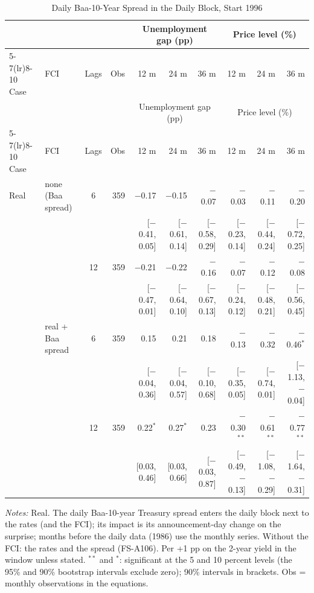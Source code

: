 \begingroup\scriptsize\setlength{\tabcolsep}{0.9pt}
\begin{longtable}{llcrrrrrrr}
\caption{Daily Baa-10-Year Spread in the Daily Block, Start 1996}\label{tab:appA2}\\
\toprule
 & & & & \multicolumn{3}{c}{Unemployment gap (pp)} & \multicolumn{3}{c}{Price level (\%)}\\ \cmidrule(lr){5-7}\cmidrule(lr){8-10}
Case & FCI & Lags & Obs & 12 m & 24 m & 36 m & 12 m & 24 m & 36 m\\
\midrule\endfirsthead
\toprule
 & & & & \multicolumn{3}{c}{Unemployment gap (pp)} & \multicolumn{3}{c}{Price level (\%)}\\ \cmidrule(lr){5-7}\cmidrule(lr){8-10}
Case & FCI & Lags & Obs & 12 m & 24 m & 36 m & 12 m & 24 m & 36 m\\
\midrule\endhead
\bottomrule\endfoot
Real & none (Baa spread) & 6 & 359 & $-$0.17 & $-$0.15 & $-$0.07 & $-$0.03 & $-$0.11 & $-$0.20\\
 & & & & {\scriptsize [$-$0.41, 0.05]} & {\scriptsize [$-$0.61, 0.14]} & {\scriptsize [$-$0.58, 0.29]} & {\scriptsize [$-$0.23, 0.14]} & {\scriptsize [$-$0.44, 0.24]} & {\scriptsize [$-$0.72, 0.25]}\\
 &  & 12 & 359 & $-$0.21 & $-$0.22 & $-$0.16 & $-$0.07 & $-$0.12 & $-$0.08\\
 & & & & {\scriptsize [$-$0.47, 0.01]} & {\scriptsize [$-$0.64, 0.10]} & {\scriptsize [$-$0.67, 0.13]} & {\scriptsize [$-$0.24, 0.12]} & {\scriptsize [$-$0.48, 0.21]} & {\scriptsize [$-$0.56, 0.45]}\\
 & real + Baa spread & 6 & 359 & 0.15 & 0.21 & 0.18 & $-$0.13 & $-$0.32 & $-$0.46$^{*}$\\
 & & & & {\scriptsize [$-$0.04, 0.36]} & {\scriptsize [$-$0.04, 0.57]} & {\scriptsize [$-$0.10, 0.68]} & {\scriptsize [$-$0.35, 0.05]} & {\scriptsize [$-$0.74, 0.01]} & {\scriptsize [$-$1.13, $-$0.04]}\\
 &  & 12 & 359 & 0.22$^{*}$ & 0.27$^{*}$ & 0.23 & $-$0.30$^{**}$ & $-$0.61$^{**}$ & $-$0.77$^{**}$\\
 & & & & {\scriptsize [0.03, 0.46]} & {\scriptsize [0.03, 0.66]} & {\scriptsize [$-$0.03, 0.87]} & {\scriptsize [$-$0.49, $-$0.13]} & {\scriptsize [$-$1.08, $-$0.29]} & {\scriptsize [$-$1.64, $-$0.31]}\\
\end{longtable}
\begin{flushleft}\footnotesize\textit{Notes:} Real. The daily Baa-10-year Treasury spread enters the daily block next to the rates (and the FCI); its impact is its announcement-day change on the surprise; months before the daily data (1986) use the monthly series. Without the FCI: the rates and the spread (FS-A106). Per +1 pp on the 2-year yield in the window unless stated. $^{**}$ and $^{*}$: significant at the 5 and 10 percent levels (the 95\% and 90\% bootstrap intervals exclude zero); 90\% intervals in brackets. Obs = monthly observations in the equations.\end{flushleft}
\endgroup
